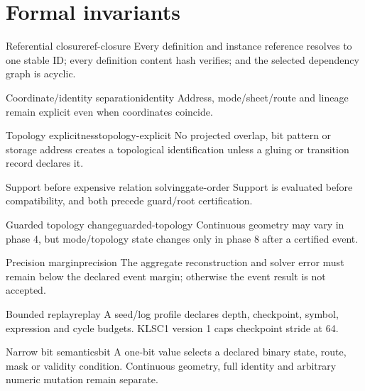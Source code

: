 \documentclass[10pt,a4paper]{article}
\begin{document}
\section{Formal invariants}
\label{sec:invariants}

\begin{invariant}{Referential closure}{ref-closure}
Every definition and instance reference resolves to one stable ID; every definition content hash verifies; and the selected dependency graph is acyclic.
\end{invariant}

\begin{invariant}{Coordinate/identity separation}{identity}
Address, mode/sheet/route and lineage remain explicit even when coordinates coincide.
\end{invariant}

\begin{invariant}{Topology explicitness}{topology-explicit}
No projected overlap, bit pattern or storage address creates a topological identification unless a gluing or transition record declares it.
\end{invariant}

\begin{invariant}{Support before expensive relation solving}{gate-order}
Support is evaluated before compatibility, and both precede guard/root certification.
\end{invariant}

\begin{invariant}{Guarded topology change}{guarded-topology}
Continuous geometry may vary in phase 4, but mode/topology state changes only in phase 8 after a certified event.
\end{invariant}

\begin{invariant}{Precision margin}{precision}
The aggregate reconstruction and solver error must remain below the declared event margin; otherwise the event result is not accepted.
\end{invariant}

\begin{invariant}{Bounded replay}{replay}
A seed/log profile declares depth, checkpoint, symbol, expression and cycle budgets. KLSC1 version 1 caps checkpoint stride at 64.
\end{invariant}

\begin{invariant}{Narrow bit semantics}{bit}
A one-bit value selects a declared binary state, route, mask or validity condition. Continuous geometry, full identity and arbitrary numeric mutation remain separate.
\end{invariant}
\end{document}
